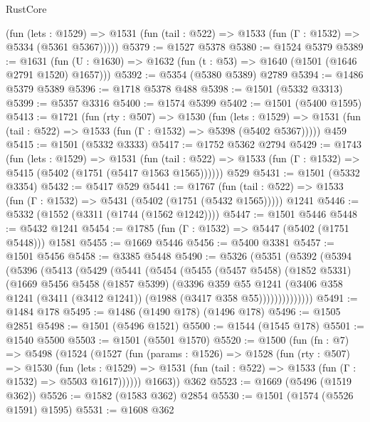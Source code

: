 \begin{lexlean}{RustCore}
\begin{coremodule}
      (fun (lets : @1529) =>
      @1531 (fun (tail : @522) => @1533 (fun (Γ : @1532) => @5334 (@5361 @5367)))))
@5379 := @1527 @5378
@5380 := @1524 @5379
@5389 := @1631 (fun (U : @1630) => @1632 (fun (t : @53) => @1640 (@1501 (@1646 @2791 @1520) @1657)))
@5392 := @5354 (@5380 @5389) @2789
@5394 := @1486 @5379 @5389
@5396 := @1718 @5378 @488
@5398 := @1501 (@5332 @3313)
@5399 := @5357 @3316
@5400 := @1574 @5399
@5402 := @1501 (@5400 @1595)
@5413 := @1721
    (fun (rty : @507) =>
    @1530
      (fun (lets : @1529) =>
      @1531 (fun (tail : @522) => @1533 (fun (Γ : @1532) => @5398 (@5402 @5367)))))
    @459
@5415 := @1501 (@5332 @3333)
@5417 := @1752 @5362 @2794
@5429 := @1743
    (fun (lets : @1529) =>
    @1531
      (fun (tail : @522) => @1533 (fun (Γ : @1532) => @5415 (@5402 (@1751 (@5417 @1563 @1565))))))
    @529
@5431 := @1501 (@5332 @3354)
@5432 := @5417 @529
@5441 := @1767
    (fun (tail : @522) => @1533 (fun (Γ : @1532) => @5431 (@5402 (@1751 (@5432 @1565)))))
    @1241
@5446 := @5332 (@1552 (@3311 (@1744 (@1562 @1242))))
@5447 := @1501 @5446
@5448 := @5432 @1241
@5454 := @1785 (fun (Γ : @1532) => @5447 (@5402 (@1751 @5448))) @1581
@5455 := @1669 @5446
@5456 := @5400 @3381
@5457 := @1501 @5456
@5458 := @3385 @5448
@5490 := @5326
    (@5351
      (@5392
        (@5394
          (@5396
            (@5413
              (@5429
                (@5441
                  (@5454
                    (@5455
                      (@5457 @5458)
                      (@1852 @5331)
                      (@1669
                        @5456
                        @5458
                        (@1857 @5399)
                        (@3396
                          @359
                          @55
                          @1241
                          (@3406
                            @358
                            @1241
                            (@3411 (@3412 @1241))
                            (@1988 (@3417 @358 @55))))))))))))))
@5491 := @1484 @178
@5495 := @1486 (@1490 @178) (@1496 @178)
@5496 := @1505 @2851
@5498 := @1501 (@5496 @1521)
@5500 := @1544 (@1545 @178)
@5501 := @1540 @5500
@5503 := @1501 (@5501 @1570)
@5520 := @1500
    (fun (fn : @7) =>
    @5498
      (@1524
        (@1527
          (fun (params : @1526) =>
          @1528
            (fun (rty : @507) =>
            @1530
              (fun (lets : @1529) =>
              @1531 (fun (tail : @522) => @1533 (fun (Γ : @1532) => @5503 @1617))))))
        @1663))
    @362
@5523 := @1669 (@5496 (@1519 @362))
@5526 := @1582 (@1583 @362) @2854
@5530 := @1501 (@1574 (@5526 @1591) @1595)
@5531 := @1608 @362

\end{coremodule}
\end{lexlean}
